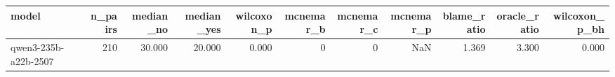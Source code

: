 \begin{tabular}{lrrrrrrrrrr}
\toprule
model & n_pairs & median_no & median_yes & wilcoxon_p & mcnemar_b & mcnemar_c & mcnemar_p & blame_ratio & oracle_ratio & wilcoxon_p_bh \\
\midrule
qwen3-235b-a22b-2507 & 210 & 30.000 & 20.000 & 0.000 & 0 & 0 & NaN & 1.369 & 3.300 & 0.000 \\
\bottomrule
\end{tabular}

